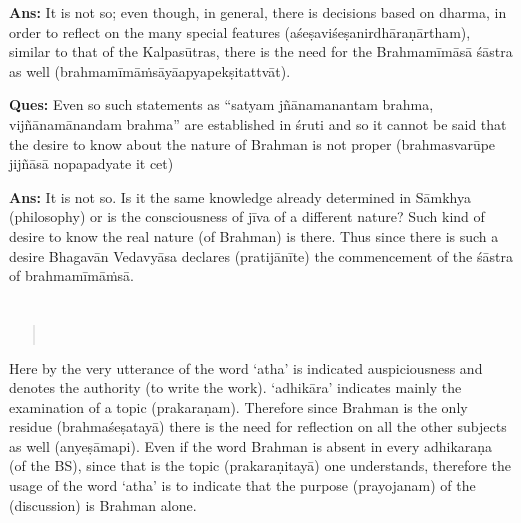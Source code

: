 \textbf{Ans:} It is not so; even though, in general, there is decisions based on dharma, in order to reflect on the many special features (aśeṣaviśeṣanirdhāraṇārtham), similar to that of the Kalpasūtras, there is the need for the Brahmamīmāsā śāstra as well (brahmamīmāṁsāyā\break apyapekṣitattvāt).

\textbf{Ques:} Even so such statements as “satyam jñānamanantam brahma, vijñānamānandam brahma” are established in śruti and so it cannot be said that the desire to know about the nature of Brahman is not proper (brahmasvarūpe jijñāsā nopapadyate it cet)

\textbf{Ans:} It is not so. Is it the same knowledge already determined in Sāmkhya (philosophy) or is the consciousness of jīva of a different nature? Such kind of desire to know the real nature (of Brahman) is there. Thus since there is such a desire Bhagavān Vedavyāsa declares (pratijānīte) the commencement of the śāstra of brahmamīmāṁsā.

\section*{}

\begin{verse}
\\
\end{verse}

Here by the very utterance of the word ‘atha’ is indicated auspiciousness and denotes the authority (to write the work). ‘adhikāra’ indicates mainly the examination of a topic (prakaraṇam). Therefore since Brahman is the only residue (brahmaśeṣatayā) there is the need for reflection on all the other subjects as well (anyeṣāmapi). Even if the word Brahman is absent in every adhikaraṇa (of the BS), since that is the topic (prakaraṇitayā) one understands, therefore the usage of the word ‘atha’ is to indicate that the purpose (prayojanam) of the (discussion) is Brahman alone. 

